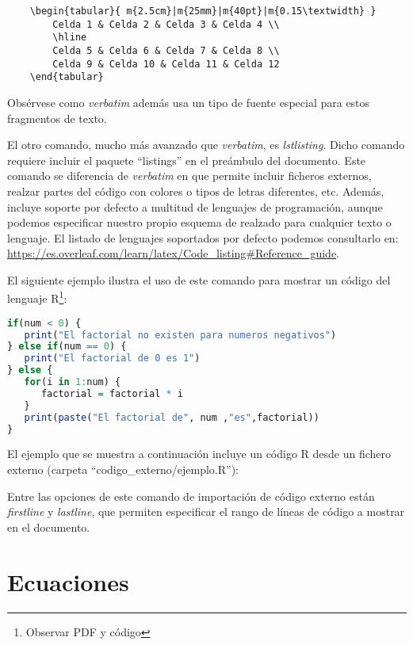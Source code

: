 \begin{verbatim}
	\begin{tabular}{ m{2.5cm}|m{25mm}|m{40pt}|m{0.15\textwidth} }
 		Celda 1 & Celda 2 & Celda 3 & Celda 4 \\
 		\hline
 		Celda 5 & Celda 6 & Celda 7 & Celda 8 \\  
 		Celda 9 & Celda 10 & Celda 11 & Celda 12   
	\end{tabular}
\end{verbatim}

Obsérvese como \emph{verbatim} además usa un tipo de fuente especial para estos fragmentos de texto.

El otro comando, mucho más avanzado que \emph{verbatim}, es \emph{lstlisting}. Dicho comando requiere incluir el paquete ``listings'' en el preámbulo del documento. Este comando se diferencia de \emph{verbatim} en que permite incluir ficheros externos, realzar partes del código con colores o tipos de letras diferentes, etc. Además, incluye soporte por defecto a multitud de lenguajes de programación, aunque podemos especificar nuestro propio esquema de realzado para cualquier texto o lenguaje. El listado de lenguajes soportados por defecto podemos consultarlo en: \url{https://es.overleaf.com/learn/latex/Code_listing#Reference_guide}.

El siguiente ejemplo ilustra el uso de este comando para mostrar un código del lenguaje R\footnote{Observar PDF y código}:

\begin{lstlisting}[language=R]
if(num < 0) {
   print("El factorial no existen para numeros negativos")
} else if(num == 0) {
   print("El factorial de 0 es 1")
} else {
   for(i in 1:num) {
      factorial = factorial * i
   }
   print(paste("El factorial de", num ,"es",factorial))
}
\end{lstlisting}

El ejemplo que se muestra a continuación incluye un código R desde un fichero externo (carpeta ``codigo\_externo/ejemplo.R''):



Entre las opciones de este comando de importación de código externo están \emph{firstline} y \emph{lastline}, que permiten especificar el rango de líneas de código a mostrar en el documento.
	
\section{Ecuaciones}

